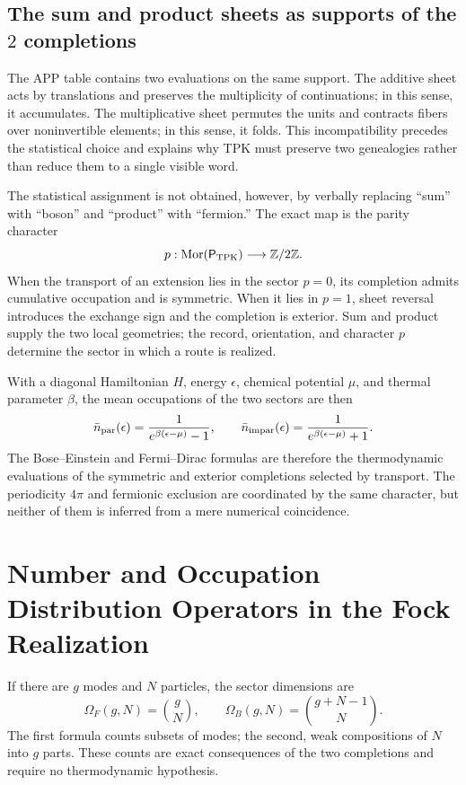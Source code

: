 \subsection{The sum and product sheets as supports of the \(2\) completions}

The APP table contains two evaluations on the same support. The
additive sheet acts by translations and preserves the multiplicity of
continuations; in this sense, it accumulates. The multiplicative sheet
permutes the units and contracts fibers over noninvertible elements; in
this sense, it folds. This incompatibility precedes the statistical
choice and explains why TPK must preserve two genealogies rather than
reduce them to a single visible word.

The statistical assignment is not obtained, however, by verbally replacing
``sum'' with ``boson'' and ``product'' with ``fermion.'' The exact map is
the parity character
\[
 p:\operatorname{Mor}(\mathsf P_{\rm TPK})\longrightarrow\mathbb Z/2\mathbb Z.
\]
When the transport of an extension lies in the sector \(p=0\), its
completion admits cumulative occupation and is symmetric. When it lies in
\(p=1\), sheet reversal introduces the exchange sign and the
completion is exterior. Sum and product supply the two
local geometries; the record, orientation, and character \(p\) determine the
sector in which a route is realized.

With a diagonal Hamiltonian \(H\), energy \(\epsilon\), chemical potential
\(\mu\), and thermal parameter \(\beta\), the mean occupations of the two
sectors are then
\[
 \bar n_{\rm par}(\epsilon)
 =\frac{1}{e^{\beta(\epsilon-\mu)}-1},
 \qquad
 \bar n_{\rm impar}(\epsilon)
 =\frac{1}{e^{\beta(\epsilon-\mu)}+1}.
\]
The Bose--Einstein and Fermi--Dirac formulas are therefore the
thermodynamic evaluations of the symmetric and exterior completions
selected by transport. The periodicity \(4\pi\) and fermionic
exclusion are coordinated by the same character, but neither of them
is inferred from a mere numerical coincidence.

\section{Number and Occupation Distribution Operators in the Fock Realization}

If there are \(g\) modes and \(N\) particles, the sector dimensions are
\[
 \Omega_F(g,N)=\binom gN,
 \qquad
 \Omega_B(g,N)=\binom{g+N-1}{N}.
\]
The first formula counts subsets of modes; the second, weak compositions of
\(N\) into \(g\) parts. These counts are exact consequences of
the two completions and require no thermodynamic hypothesis.

